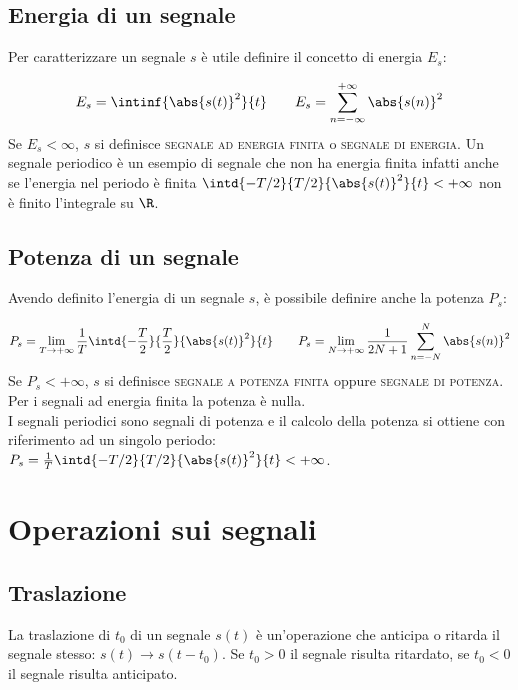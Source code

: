 \subsection{Energia di un segnale}
Per caratterizzare un segnale $s$ è utile definire il concetto di energia $E_s$:

\begin{equation}
\label{eq:segnale_energia}
	E_s=\intinf{\abs{s(t)}^2}{t} \qquad E_s=\sum_{n=-\infty}^{+\infty}\abs{s(n)}^2
\end{equation}
Se $E_s < \infty$, $s$ si definisce \textsc{segnale ad energia finita} o \textsc{segnale di energia}. \newline Un segnale periodico è un esempio di segnale che non ha energia finita infatti anche se l'energia nel periodo è finita $\intd{-T/2}{T/2}{\abs{s(t)}^2}{t}<+\infty$ non è finito l'integrale su $\R$.

\subsection{Potenza di un segnale}
Avendo definito l'energia di un segnale $s$, è possibile definire anche la potenza $P_s$:

\begin{equation}
\label{eq:segnale_potenza}
	P_s=\lim\limits_{T\to+\infty}{\frac{1}{T}\intd{-\frac{T}{2}}{\frac{T}{2}}{\abs{s(t)}^2}{t}}\qquad
	P_s=\lim\limits_{N\to+\infty}{\frac{1}{2N+1}\sum_{n=-N}^{N}{\abs{s(n)}^2}}
\end{equation}
Se $P_s<+\infty$, $s$ si definisce \textsc{segnale a potenza finita} oppure \textsc{segnale di potenza}. \\ Per i segnali ad energia finita la potenza è nulla. \\ I segnali periodici sono segnali di potenza e il calcolo della potenza si ottiene con riferimento ad un singolo periodo: $P_s=\frac{1}{T}\intd{-T/2}{T/2}{\abs{s(t)}^2}{t}<+\infty$.

\section{Operazioni sui segnali}
\subsection{Traslazione}
La traslazione di $t_0$ di un segnale $s(t)$ è un'operazione che anticipa o ritarda il segnale stesso:
$s(t) \to s(t-t_0)$. Se $t_0>0$ il segnale risulta ritardato, se $t_0<0$ il segnale risulta anticipato.

